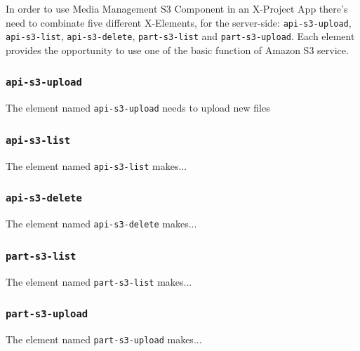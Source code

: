In order to use Media Management S3 Component in an X-Project App there's need to combinate five different X-Elements, for the server-side: \texttt{api-s3-upload}, \texttt{api-s3-list}, \texttt{api-s3-delete}, \texttt{part-s3-list} and \texttt{part-s3-upload}.
Each element provides the opportunity to use one of the basic function of Amazon S3 service. 

\subsubsection{\texttt{api-s3-upload}}
\label{api-s3-upload}
The element named \texttt{api-s3-upload} needs to upload new files 

\subsubsection{\texttt{api-s3-list}}
\label{api-s3-list}
The element named \texttt{api-s3-list} makes...

\subsubsection{\texttt{api-s3-delete}}
\label{api-s3-delete}
The element named \texttt{api-s3-delete} makes...

\subsubsection{\texttt{part-s3-list}}
\label{part-s3-list}
The element named \texttt{part-s3-list} makes...

\subsubsection{\texttt{part-s3-upload}}
\label{part-s3-upload}
The element named \texttt{part-s3-upload} makes...




